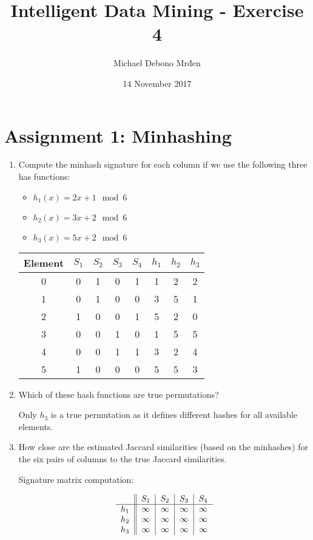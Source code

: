 \documentclass{article}
\title{Intelligent Data Mining - Exercise 4}
\author{\fontencoding{T1}\selectfont Michael Debono Mrđen}
\date{14 November 2017}
\begin{document}
\maketitle

\section{Assignment 1: Minhashing}
\renewcommand{\labelenumi}{\alph{enumi}.}
\renewcommand{\labelenumii}{(\alph{enumii})}

\begin{enumerate}
\item{Compute the minhash signature for each column if we use the following three has functions:
	\begin{itemize}
		\item $h_1(x)=2x+1\mod{6}$
		\item $h_2(x)=3x+2\mod{6}$
		\item $h_3(x)=5x+2\mod{6}$
	\end{itemize}

\begin{center}
\begin{tabular}{ c | c | c | c | c || c | c | c }
	Element & $S_1$ & $S_2$ & $S_3$ & $S_4$ & $h_1$ & $h_2$ & $h_3$ \\ \hline\hline
	0       & 0     & 1     & 0     & 1     & 1     & 2     & 2     \\
	1       & 0     & 1     & 0     & 0     & 3     & 5     & 1     \\
	2       & 1     & 0     & 0     & 1     & 5     & 2     & 0     \\
	3       & 0     & 0     & 1     & 0     & 1     & 5     & 5     \\
	4       & 0     & 0     & 1     & 1     & 3     & 2     & 4     \\
	5       & 1     & 0     & 0     & 0     & 5     & 5     & 3
\end{tabular}
\end{center}
	
}
\item{Which of these hash functions are true permutations?
	
Only $h_3$ is a true permutation as it defines different hashes for all available elements.
}
\item{How close are the estimated Jaccard similarities (based on the minhashes) for the six pairs of columns to the true Jaccard similarities.

Signature matrix computation:
\begin{center}
	\begin{equation}
	\begin{tabular}{ c || c | c | c | c } \label{1}
		      & $S_1$    & $S_2$    & $S_3$    & $S_4$    \\ \hline
		$h_1$ & $\infty$ & $\infty$ & $\infty$ & $\infty$ \\
		$h_2$ & $\infty$ & $\infty$ & $\infty$ & $\infty$ \\
		$h_3$ & $\infty$ & $\infty$ & $\infty$ & $\infty$
	\end{tabular}
	\end{equation}


\end{center}}
\end{enumerate}
\end{document}
